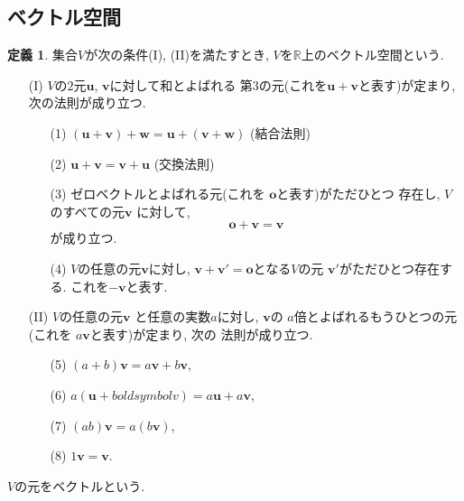 \documentclass[a4j,12pt]{jarticle}
\theoremstyle{definition}
\newtheorem{definition}[theorem]{定義}
\begin{document}
\subsection{ベクトル空間}\label{def:vector space}
\begin{definition}
    集合$V$が次の条件(I), (II)を満たすとき, 
    $V$を$\mathbb{R}$上のベクトル空間という. 
    \begin{itemize}
        \item[(I)]$V$の$2$元$\boldsymbol{u}$, 
        $\boldsymbol{v}$に対して和とよばれる
        第$3$の元(これを$\boldsymbol{u}+
        \boldsymbol{v}$と表す)が定まり, 
        次の法則が成り立つ.  
        \begin{itemize}
            \item[(1)]
            $(\boldsymbol{u}+
            \boldsymbol{v})+\boldsymbol{w}=
            \boldsymbol{u}+
            (\boldsymbol{v}+\boldsymbol{w})$ 
            (結合法則)
            \item[(2)]
            $\boldsymbol{u}+
            \boldsymbol{v}=
            \boldsymbol{v}+
            \boldsymbol{u}$ 
            (交換法則)
            \item[(3)]
            ゼロベクトルとよばれる元(これを
            $\boldsymbol{o}$と表す)がただひとつ
            存在し, $V$のすべての元$\boldsymbol{v}$
            に対して, 
            $$\boldsymbol{o}+\boldsymbol{v}=
            \boldsymbol{v}$$
            が成り立つ. 
            \item[(4)]
            $V$の任意の元$\boldsymbol{v}$に対し, 
            $\boldsymbol{v}+\boldsymbol{v'}=
            \boldsymbol{o}$となる$V$の元
            $\boldsymbol{v'}$がただひとつ存在する. 
            これを$-\boldsymbol{v}$と表す. 
        \end{itemize} 
        \item[(II)]$V$の任意の元$\boldsymbol{v}$
        と任意の実数$a$に対し, $\boldsymbol{v}$の
        $a$倍とよばれるもうひとつの元(これを
        $a\boldsymbol{v}$と表す)が定まり, 次の
        法則が成り立つ. 
        \begin{itemize}
            \item[(5)]
            $(a+b)\boldsymbol{v}=
            a\boldsymbol{v}+
            b\boldsymbol{v}$,\ 
            \item[(6)]
            $a(\boldsymbol{u}+boldsymbol{v})=
            a\boldsymbol{u}+a\boldsymbol{v}$,\ 
            \item[(7)]
            $(ab)\boldsymbol{v}=a(b\boldsymbol{v})$,\ 
            \item[(8)]
            $1\boldsymbol{v}=\boldsymbol{v}$. 
        \end{itemize}
    \end{itemize}
    $V$の元をベクトルという. 
\end{definition}
\end{document}
